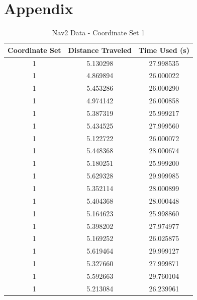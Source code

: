 \documentclass[]{article}
\begin{document}
	\section{Appendix}
	\begin{table}[h!]
		\centering
		\begin{tabular}{|c|c|c|}
			\hline
			Coordinate Set & Distance Traveled & Time Used (s) \\
			\hline
			1 & 5.130298 & 27.998535 \\
			1 & 4.869894 & 26.000022 \\
			1 & 5.453286 & 26.000290 \\
			1 & 4.974142 & 26.000858 \\
			1 & 5.387319 & 25.999217 \\
			1 & 5.434525 & 27.999560 \\
			1 & 5.122722 & 26.000072 \\
			1 & 5.448368 & 28.000674 \\
			1 & 5.180251 & 25.999200 \\
			1 & 5.629328 & 29.999985 \\
			1 & 5.352114 & 28.000899 \\
			1 & 5.404368 & 28.000448 \\
			1 & 5.164623 & 25.998860 \\
			1 & 5.398202 & 27.974977 \\
			1 & 5.169252 & 26.025875 \\
			1 & 5.619464 & 29.999127 \\
			1 & 5.327660 & 27.999871 \\
			1 & 5.592663 & 29.760104 \\
			1 & 5.213084 & 26.239961 \\
			\hline
		\end{tabular}
		\caption{Nav2 Data - Coordinate Set 1}
		\label{tab:2}
	\end{table}
	
\end{document}
